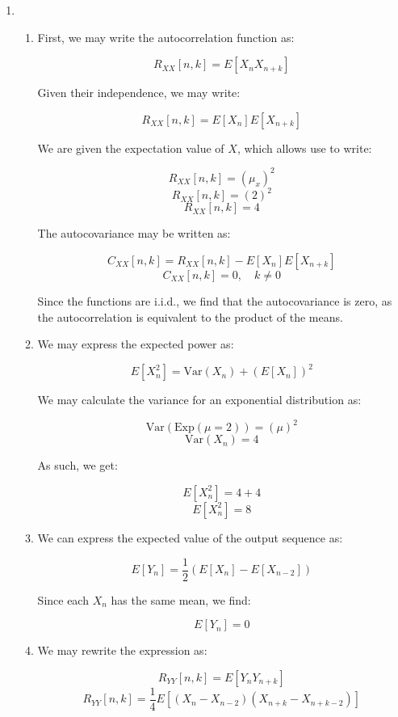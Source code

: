 \begin{enumerate}

  \item

    \begin{enumerate}

      \item First, we may write the autocorrelation function as:

        $$R_{XX}[n,k]=E[X_nX_{n+k}]$$

        Given their independence, we may write:

        $$R_{XX}[n,k]=E[X_n]E[X_{n+k}]$$

        We are given the expectation value of $X$, which allows use to write:

        $$R_{XX}[n,k]=(\mu_x)^2$$
        $$R_{XX}[n,k]=(2)^2$$
        $$\boxed{R_{XX}[n,k]=4}$$

        The autocovariance may be written as:

        $$C_{XX}[n,k]=R_{XX}[n,k]-E[X_n]E[X_{n+k}]$$
        $$\boxed{C_{XX}[n,k]=0,\quad k\neq0}$$

        Since the functions are i.i.d., we find that the autocovariance is zero, as the autocorrelation is equivalent to the product of the means.

      \item We may express the expected power as:

        $$E[X_n^2]=\text{Var}(X_n)+(E[X_n])^2$$

        We may calculate the variance for an exponential distribution as:

        $$\text{Var}(\text{Exp}(\mu=2))=(\mu)^2$$
        $$\text{Var}(X_n)=4$$

        As such, we get:

        $$E[X_n^2]=4+4$$
        $$\boxed{E[X_n^2]=8}$$

      \item We can express the expected value of the output sequence as:

        $$E[Y_n]=\frac{1}{2}(E[X_n]-E[X_{n-2}])$$

        Since each $X_n$ has the same mean, we find:

        $$\boxed{E[Y_n]=0}$$

      \item We may rewrite the expression as:

        $$R_{YY}[n,k]=E[Y_nY_{n+k}]$$
        $$R_{YY}[n,k]=\frac{1}{4}E[(X_n-X_{n-2})(X_{n+k}-X_{n+k-2})]$$


\end{enumerate}
\end{enumerate}

